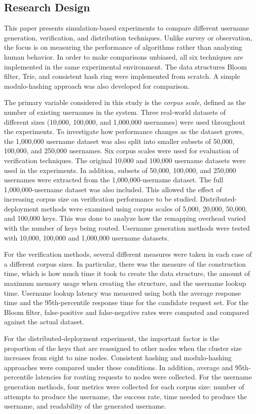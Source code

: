 \documentclass[conference]{IEEEtran}
\begin{document}
\subsection{Research Design}
This paper presents simulation-based experiments to compare different username generation, verification, and distribution techniques. Unlike survey or observation, the focus is on measuring the performance of algorithms rather than analyzing human behavior. In order to make comparisons unbiased, all six techniques are implemented in the same experimental environment. The data structures Bloom filter, Trie, and consistent hash ring were implemented from scratch. A simple modulo-hashing approach was also developed for comparison.

The primary variable considered in this study is the \textit{corpus scale}, defined as the number of existing usernames in the system. Three real-world datasets of different sizes (10,000, 100,000, and 1,000,000 usernames) were used throughout the experiments. To investigate how performance changes as the dataset grows, the 1,000,000 username dataset was also split into smaller subsets of 50,000, 100,000, and 250,000 usernames. Six corpus scales were used for evaluation of verification techniques. The original 10,000 and 100,000 username datasets were used in the experiments. In addition, subsets of 50,000, 100,000, and 250,000 usernames were extracted from the 1,000,000-username dataset. The full 1,000,000-username dataset was also included. This allowed the effect of increasing corpus size on verification performance to be studied. Distributed-deployment methods were examined using corpus scales of 5,000, 20,000, 50,000, and 100,000 keys. This was done to analyze how the remapping overhead varied with the number of keys being routed. Username generation methods were tested with 10,000, 100,000 and 1,000,000 username datasets. 

For the verification methods, several different measures were taken in each case of a different corpus sizes. In particular, there was the measure of the construction time, which is how much time it took to create the data structure, the amount of maximum memory usage when creating the structure, and the username lookup time. Username lookup latency was measured using both the average response time and the 95th-percentile response time for the candidate request set. For the Bloom filter, false-positive and false-negative rates were computed and compared against the actual dataset.

For the distributed-deployment experiment, the important factor is the proportion of the keys that are reassigned to other nodes when the cluster size increases from eight to nine nodes. Consistent hashing and modulo-hashing approaches were compared under these conditions. In addition, average and 95th-percentile latencies for routing requests to nodes were collected. For the username generation methods, four metrics were collected for each corpus size: number of attempts to produce the username, the success rate, time needed to produce the username, and readability of the generated username.
\end{document}
